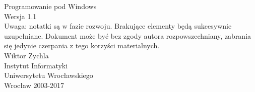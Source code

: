 ﻿\begin{titlepage}
\begin{center}
\textsf{
\Huge Programowanie pod Windows\\
\vspace*{1.5cm}
\small Wersja 1.1\\
Uwaga: notatki są w fazie rozwoju. Brakujące elementy będą sukcesywnie uzupełniane. 
Dokument może być bez zgody autora rozpowszechniany, zabrania się jedynie czerpania z tego 
korzyści materialnych.\\
\vspace*{4.5cm}
\Large Wiktor Zychla\\
\vspace{1.5cm}
\Large
Instytut Informatyki\\Uniwersytetu Wrocławskiego\\
\vfill
Wrocław 2003-2017}
\end{center}
\end{titlepage}
